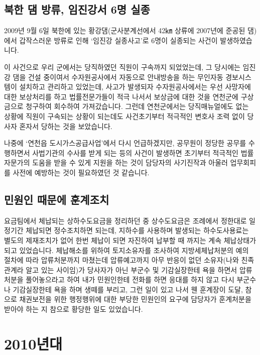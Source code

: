 \documentclass[chapter,book,openany,twoside]{oblivoir}
\begin{document}
\subsection{북한 댐 방류, 임진강서 6명 실종}

2009년 9월 6일 북한에 있는 황강댐(군사분계선에서 42㎞ 상류에 2007년에 준공된 댐)에서 갑작스러운 방류로 인해 `임진강 실종사고'로 6명이 실종되는 사건이 발생하였습니다. 

이 사건으로 우리 군에서는 당직하였던 직원이 구속까지 되었었는데, 그 당시에는 임진강 댐을 건설 중이여서 수자원공사에서 자동으로 안내방송을 하는 무인자동 경보시스템이 설치하고 관리하고 있었는데, 사고가 발생되자 수자원공사에서는 우선 사망자에 대한 보상처리를 하고 법률전문가들이 적극 나서서 보상금에 대한 것을 연천군에 구상금으로 청구하여 회수하여 가져갔습니다. 그런데 연천군에서는 당직매뉴얼에도 없는 상황에 직원이 구속되는 상황이 되는데도 사건초기부터 적극적인 변호사 조력 없이 당사자 혼자서 당하는 것을 보았습니다.

나중에 `연천읍 도시가스공급사업'에서 다시 언급하겠지만, 공무원이 정당한 공무를 수행하면서 사법기관의 수사를 받게 되는 등의 사건이 발생하면 초기부터 적극적인 법률자문가의 도움을 받을 수 있게 지원을 하는 것이 담당자의 사기진작과 아울러 업무회피를 사전에 예방하는 것이 필요하였던 것 같습니다. 


\subsection{민원인 때문에 훈계조치}

요금팀에서 체납되는 상하수도요금을 정리하던 중 상수도요금은 조례에서 정한대로 일정기간 체납되면 정수조치하면 되는데, 지하수를 사용하며 발생되는 하수도사용료는 별도의 제재조치가 없어 한번 체납이 되면 자진하여 납부할 때 까지는 계속 체납상태가 되고 있었습니다. 체납해소를 위하여 토지소유자를 조사하여 지방세체납처분의 예의 절차에 따라 압류처분까지 마쳤는데 압류예고까지 아무 반응이 없던 소유자(나와 친족관계라 알고 있는 사이임)가 당사자가 아닌 부군수 및 기감실장한테 욕을 하면서 압류처분을 풀어놓으라고 하여 내가 민원인한테 전화를 하면 응대를 하지 않고 다시 부군수나 기감실장한테 욕을 하며 생떼를 부리고, 그런 일이 있고 나서 웬 훈계장이 도달, 참으로 채권보전을 위한 행정행위에 대한 부당한 민원인의 요구에 담당자가 훈계처분을 받아야 하는 지 참으로 황당한 일도 있었습니다.

\section{2010년대}
\end{document}
